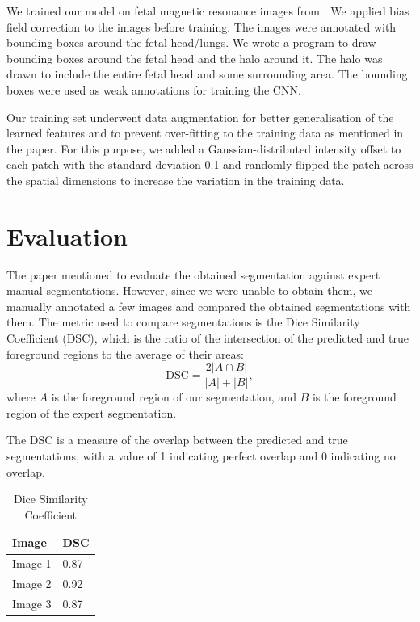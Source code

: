 \documentclass[a4paper]{article}
\begin{document}
We trained our model on fetal magnetic resonance images from \cite{dataset}.
We applied bias field correction to the images before training. The images were
annotated with bounding boxes around the fetal head/lungs. We wrote a program to
draw bounding boxes around the fetal head and the halo around it. The halo was
drawn to include the entire fetal head and some surrounding area. The bounding
boxes were used as weak annotations for training the CNN.

Our training set underwent data augmentation for better generalisation of the
learned features and to prevent over-fitting to the training data as mentioned
in the paper. For this purpose, we added a Gaussian-distributed intensity offset
to each patch with the standard deviation 0.1 and randomly flipped the patch
across the spatial dimensions to increase the variation in the training data.

\section{Evaluation}
The paper mentioned to evaluate the obtained segmentation against expert manual
segmentations. However, since we were unable to obtain them, we manually
annotated a few images and compared the obtained segmentations with them. The
metric used to compare segmentations is the Dice Similarity Coefficient (DSC),
which is the ratio of the intersection of the predicted and true foreground
regions to the average of their areas: \[
    \text{DSC} = \frac{2 |A \cap B|}{|A| + |B|},
\] where $A$ is the foreground region of our segmentation, and $B$ is the
foreground region of the expert segmentation.

The DSC is a measure of the overlap between the predicted and true
segmentations, with a value of 1 indicating perfect overlap and 0 indicating no
overlap.

\begin{table}
    \centering
    \begin{tabular}{l l}
        \toprule
        Image & DSC \\
        \midrule
        Image 1 & 0.87 \\
        Image 2 & 0.92 \\
        Image 3 & 0.87 \\
        \bottomrule
    \end{tabular}
    \caption{Dice Similarity Coefficient}
    \label{tab:dsc}
\end{table}
\end{document}
